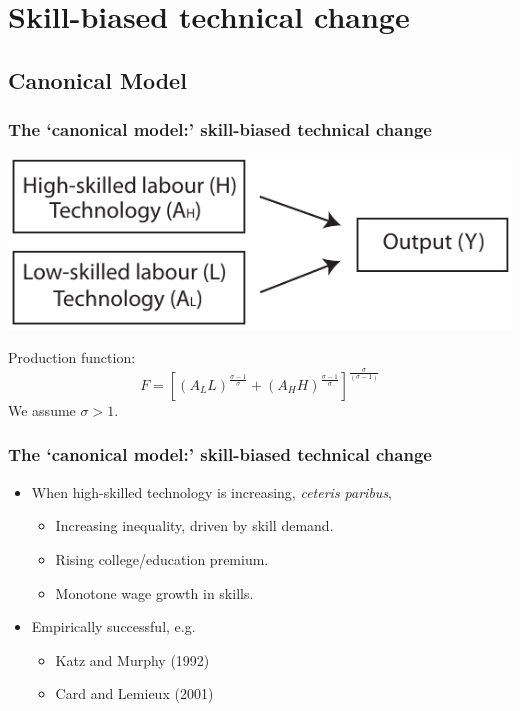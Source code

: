 \documentclass[red]{beamer}
\begin{document}
\section{Skill-biased technical change}
\subsection{Canonical Model}
\begin{frame}[c]
\frametitle{The `canonical model:' skill-biased technical change}
\begin{center}
  \includegraphics[width=\textwidth]{slides_fig/CES.pdf}
\end{center}
\pause
Production function:
\begin{equation*}
  \label{eq:cobbdoug}
  F = \left[\left(A_LL\right)^{\frac{\sigma - 1}{\sigma}}
            + \left(A_HH\right)^{\frac{\sigma - 1}{\sigma}}
          \right]^\frac{\sigma}{(\sigma-1)}
\end{equation*}
We assume $\sigma>1$.
\end{frame}

\begin{frame}
\frametitle{The `canonical model:' skill-biased technical change}
\begin{itemize}
\item When high-skilled technology is increasing, {\em ceteris paribus},
  \begin{itemize}
  \item Increasing inequality, driven by skill demand.
  \item Rising college/education premium.
  \item Monotone wage growth in skills.
  \end{itemize}
\vspace{1cm}
\item Empirically successful, e.g.
  \begin{itemize}
  \item Katz and Murphy (1992)
  \item Card and Lemieux (2001)
  \end{itemize}
\end{itemize}
\end{frame}
\end{document}
